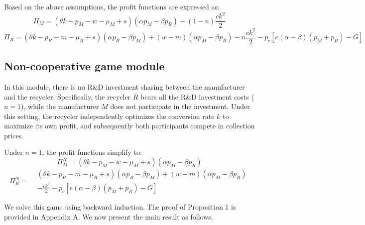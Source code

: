 \documentclass[authoryear,preprint,review,times,10pt]{elsarticle}
\begin{document}
Based on the above assumptions, the profit functions are expressed as:
\begin{equation}
\Pi_M = (\theta k - p_M - w - \mu_M + s)(\alpha p_M - \beta p_R) - (1 - n)\frac{c k^2}{2}
\end{equation}
\begin{equation}
\Pi_R = (\theta k - p_R - m - \mu_R + s)(\alpha p_R - \beta p_M) + (w - m)(\alpha p_M - \beta p_R) - n\frac{c k^2}{2} - p_c\left[ e(\alpha - \beta)(p_M + p_R) - G \right]
\end{equation}

\subsection{Non-cooperative game module}
In this module, there is no R\&D investment sharing between the manufacturer and the recycler. Specifically, the recycler $R$ bears all the R\&D investment costs ($n=1$), while the manufacturer $M$ does not participate in the investment. Under this setting, the recycler independently optimizes the conversion rate $k$ to maximize its own profit, and subsequently both participants compete in collection prices.

Under $n=1$, the profit functions simplify to:
\begin{equation}
\Pi_M^N = (\theta k - p_M - w - \mu_M + s)(\alpha p_M - \beta p_R)
\label{eq:profit_MN}
\end{equation}
\begin{equation}
\Pi_R^N =
\begin{aligned}
& (\theta k - p_R - m - \mu_R + s)(\alpha p_R - \beta p_M) + (w - m)(\alpha p_M - \beta p_R) \\
& - \frac{c k^2}{2} - p_c\left[ e(\alpha - \beta)(p_M + p_R) - G \right]
\end{aligned}
\label{eq:profit_RN}
\end{equation}

We solve this game using backward induction. The proof of Proposition 1 is provided in Appendix A. We now present the main result as follows.
\end{document}
